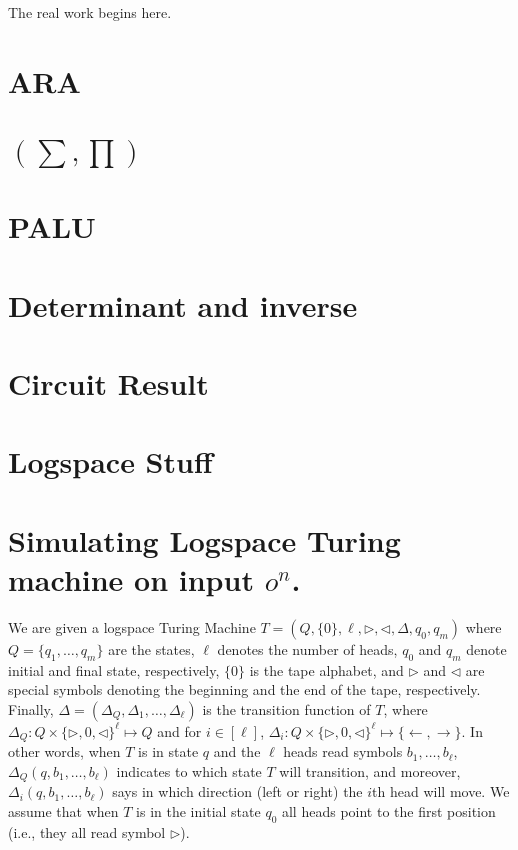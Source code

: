 The real work begins here.

\section{ARA}

\section{\lang$(\sum,\prod)$}

\section{PALU}

\section{Determinant and inverse}

\section{Circuit Result}

\section{Logspace Stuff}

\section*{Simulating Logspace Turing machine on input $o^n$.}

We are given a logspace Turing Machine $T=\left(Q,\{0\},\ell,\rhd,\lhd,\Delta,q_0,q_m\right)$ where $Q=\{q_1,\ldots,q_m\}$ are the states, $\ell$ denotes the number of heads, $q_0$ and $q_m$ denote initial and final state, respectively, $\{0\}$ is the tape alphabet, and $\rhd$ and $\lhd$ are special symbols denoting the beginning and the end of the tape, respectively. Finally,
$\Delta=(\Delta_Q,\Delta_1,\ldots,\Delta_\ell)$ is the transition function of $T$, where $\Delta_Q:Q\times \{\rhd,0,\lhd\}^\ell\mapsto Q$ and for $i\in[\ell]$,
$\Delta_i:Q\times  \{\rhd,0,\lhd\}^\ell\mapsto\{\gets,\to\}$. In other words, when $T$ is in state $q$ and the $\ell$ heads read symbols $b_1,\ldots,b_\ell$, $\Delta_Q(q,b_1,\ldots,b_\ell)$ indicates to which state $T$ will transition, and moreover, $\Delta_i(q,b_1,\ldots,b_\ell)$ says in which direction (left or right) the $i$th head will move. We assume that when $T$ is in the initial state $q_0$ all heads point to the first position (i.e., they all read symbol $\rhd$). 

